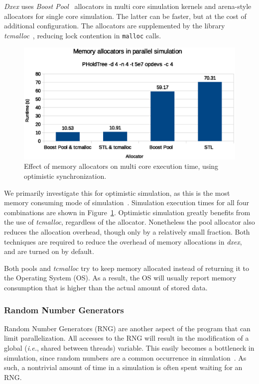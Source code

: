 \textit{Dxex} uses \textit{Boost Pool}~\cite{boostpool} allocators in multi core simulation kernels and arena-style allocators for single core simulation.
The latter can be faster, but at the cost of additional configuration.
The allocators are supplemented by the library \textit{tcmalloc}~\cite{tcmalloc}, reducing lock contention in \texttt{malloc} calls.

\begin{figure}
    \center
    \includegraphics[width=\columnwidth]{fig/memory_allocators_parallel.eps}
    \caption{Effect of memory allocators on multi core execution time, using optimistic synchronization.}
    \label{fig:memallocators_parallel}
\end{figure}

We primarily investigate this for optimistic simulation, as this is the most memory consuming mode of simulation~\cite{FujimotoBook}.
Simulation execution times for all four combinations are shown in Figure~\ref{fig:memallocators_parallel}.
Optimistic simulation greatly benefits from the use of \textit{tcmalloc}, regardless of the allocator.
Nonetheless the pool allocator also reduces the allocation overhead, though only by a relatively small fraction.
Both techniques are required to reduce the overhead of memory allocations in \textit{dxex}, and are turned on by default.

Both pools and \textit{tcmalloc} try to keep memory allocated instead of returning it to the Operating System (OS).
As a result, the OS will usually report memory consumption that is higher than the actual amount of stored data.

\subsubsection{Random Number Generators}
Random Number Generators (RNG) are another aspect of the program that can limit parallelization.
All accesses to the RNG will result in the modification of a global (\textit{i.e.}, shared between threads) variable.
This easily becomes a bottleneck in simulation, since random numbers are a common occurrence in simulation~\cite{Random}.
As such, a nontrivial amount of time in a simulation is often spent waiting for an RNG.

